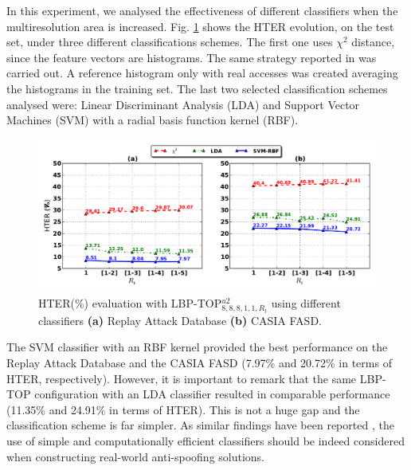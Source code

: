 In this experiment, we analysed the effectiveness of different classifiers when the multiresolution area is increased. Fig. \ref{fig:evaluation_classifiers} shows the HTER evolution, on the test set, under three different classifications schemes. The first one uses $\chi^2$ distance, since the feature vectors are histograms. The same strategy reported in \cite{ChingovskaBIOSIG2012} was carried out. A reference histogram only with real accesses was created averaging the histograms in the training set. The last two selected classification schemes analysed were: Linear Discriminant Analysis (LDA) and Support Vector Machines (SVM) with a radial basis function kernel (RBF).

\begin{figure}[!btb]
\begin{center}
\includegraphics [width=\textwidth] {images/proposed_countermeasure/evaluation_classifiers.pdf}
\caption[HTER(\%) evaluation with LBP-TOP$_{8,8,8,1,1,R_t}^{u2}$ using different classifiers]{HTER(\%) evaluation with LBP-TOP$_{8,8,8,1,1,R_t}^{u2}$ using different classifiers \textbf{(a)} Replay Attack Database \textbf{(b)} CASIA FASD.} \label{fig:evaluation_classifiers}
\end{center}
\end{figure}


The SVM classifier with an RBF kernel provided the best performance on the Replay Attack Database and the CASIA FASD (7.97\% and 20.72\% in terms of HTER, respectively). However, it is important to remark that the same LBP-TOP configuration with an LDA classifier resulted in comparable performance (11.35\% and 24.91\% in terms of HTER). This is not a huge gap and the classification scheme is far simpler. As similar findings have been reported \cite{ChingovskaBIOSIG2012,Komulainen_ICB_2013}, the use of simple and computationally efficient classifiers should be indeed considered when constructing real-world anti-spoofing solutions.


